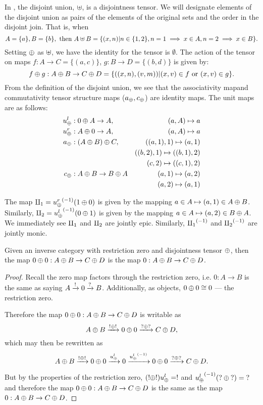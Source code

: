 \begin{example}\label{ex:pinj_has_disjointness_tensor}
  In \pinj, the disjoint union, $\uplus$, is a disjointness tensor. We will designate elements of
  the disjoint union as pairs of the elements of the original sets and the order in the disjoint
  join. That is, when
  \[
     A=\{a\}, B=\{b\}, \text{ then } A\uplus B = \{(x,n) | n\in\{1,2\},n =1 \implies x \in A, n = 2
     \implies x\in B\}.
  \]
  Setting $\oplus$ as $\uplus$, we  have the identity for the tensor is $\emptyset$. The action
  of the tensor on maps $f:A\to C = \{(a,c)\}$, $g:B\to D = \{(b,d)\}$ is given by:
  \[
    f\oplus g:A\oplus B\to C\oplus D = \{((x,n),(v,m)) | (x,v)\in f \text{ or } (x,v) \in g\}.
  \]
  From the definition of the disjoint union, we see that the associativity mapand commutativity tensor
  structure  maps ($a_\oplus, c_\oplus$) are identity maps. The unit maps are as follows:
  \begin{align*}
    u_{\oplus}^l &:0\oplus A \to A, &(a,A) \mapsto a\\
    u_{\oplus}^r &:A\oplus0 \to A, &(a,A) \mapsto a\\
    a_\oplus &: (A\oplus B)\oplus C, &((a,1),1) \mapsto (a,1)\\
     &  &((b,2),1) \mapsto ((b,1),2)\\
     &  &(c,2) \mapsto ((c,1),2)\\
    c_\oplus &: A\oplus B \to B\oplus A & (a,1) \mapsto (a,2)\\
    & & (a,2) \mapsto (a,1)
  \end{align*}

  The map $\amalg_{1} = {u_{\oplus}^r}^{(-1)}(1\oplus0)$ is given by the mapping $a\in A\mapsto (a,1) \in
  A\oplus B$. Similarly, $\amalg_{2} = {u_{\oplus}^l}^{(-1)}(0\oplus1)$ is given by the mapping $a\in A\mapsto (a,2) \in
  B\oplus A$. We immediately see $\amalg_{1}$ and $\amalg_{2}$ are jointly epic. Similarly, ${\amalg_{1}}^{(-1)}$ and ${\amalg_{2}}^{(-1)}$ are
  jointly monic.
\end{example}

\begin{lemma}\label{lem:zero_plus_zero_is_zero}
  Given an inverse category \X with restriction zero and disjointness tensor $\oplus$, then the map
  $0\oplus0: A\oplus B \to C\oplus D$ is the map $0: A\oplus B \to C\oplus D$.
\end{lemma}
\begin{proof}
  Recall the zero map factors through the restriction zero, i.e. $0:A \to B$ is the same as
  saying $A\xrightarrow{!} 0 \xrightarrow{\mathbf{?}}B$. Additionally, as objects, $0\oplus0 \cong 0$ ---
  the restriction zero.

  Therefore the map $0\oplus0: A\oplus B \to C\oplus D$ is writable as
  \[
    A\oplus B \xrightarrow{!\oplus!}0\oplus0  \xrightarrow{\mathbf{?}\oplus\mathbf{?}} C\oplus D,
  \]
  which may then be rewritten as
  \[
    A\oplus B \xrightarrow{!\oplus!}0\oplus0 \xrightarrow{u_{\oplus}^l} 0
      \xrightarrow{{u_{\oplus}^l}^{(-1)}} 0\oplus0 \xrightarrow{\mathbf{?}\oplus\mathbf{?}} C\oplus D.
  \]

  But by the properties of the restriction zero, $(!\oplus!) u_{\oplus}^l = !$ and ${u_{\oplus}^l}^{(-1)}(\mathbf{?}\oplus\mathbf{?}) = \mathbf{?}$
  and therefore the map $0\oplus0: A\oplus B \to C\oplus D$ is the same as the map $0: A\oplus B \to C\oplus D$.
\end{proof}


